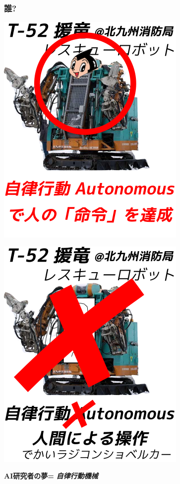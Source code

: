\subsubsection{誰?}
\label{sec:orgheadline7}

\begin{container-fluid}
\begin{row-fluid}
\begin{span6}
\includegraphics{img/rescue/final2.png}
\end{span6}
\begin{span6}
\includegraphics{img/rescue/final3.png}
\end{span6}
\end{row-fluid}
\begin{row-fluid}
\begin{span12}
\begin{xlarge}
\textbf{AI研究者の夢=} \textbf{\emph{自律行動機械}}
\end{xlarge}
\end{span12}
\end{row-fluid}
\end{container-fluid}

